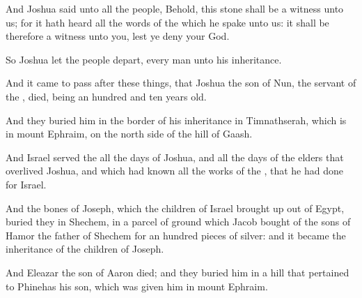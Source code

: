 \Verse And Joshua said unto all the people, Behold, this stone shall be a witness unto us; for it hath heard all the words of the \LORD which he spake unto us: it shall be therefore a witness unto you, lest ye deny your God.

\Verse So Joshua let the people depart, every man unto his inheritance.

\Verse And it came to pass after these things, that Joshua the son of Nun, the servant of the \LORD, died, being an hundred and ten years old.

\Verse And they buried him in the border of his inheritance in Timnathserah, which is in mount Ephraim, on the north side of the hill of Gaash.

\Verse And Israel served the \LORD all the days of Joshua, and all the days of the elders that overlived Joshua, and which had known all the works of the \LORD, that he had done for Israel.

\Verse And the bones of Joseph, which the children of Israel brought up out of Egypt, buried they in Shechem, in a parcel of ground which Jacob bought of the sons of Hamor the father of Shechem for an hundred pieces of silver: and it became the inheritance of the children of Joseph.

\Verse And Eleazar the son of Aaron died; and they buried him in a hill that pertained to Phinehas his son, which was given him in mount Ephraim.

